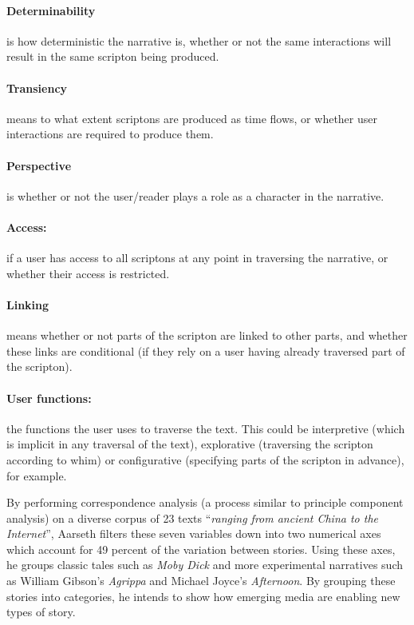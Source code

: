 \paragraph{Determinability} is how deterministic the narrative is, whether or not the same interactions will result in the same scripton being produced.
\paragraph{Transiency} means to what extent scriptons are produced as time flows, or whether user interactions are required to produce them.
\paragraph{Perspective} is whether or not the user/reader plays a role as a character in the narrative.
\paragraph{Access:} if a user has access to all scriptons at any point in traversing the narrative, or whether their access is restricted.
\paragraph{Linking} means whether or not parts of the scripton are linked to other parts, and whether these links are conditional (if they rely on a user having already traversed part of the scripton).
\paragraph{User functions:} the functions the user uses to traverse the text. This could be interpretive (which is implicit in any traversal of the text), explorative (traversing the scripton according to whim) or configurative (specifying parts of the scripton in advance), for example.


By performing correspondence analysis (a process similar to principle component analysis) on a diverse corpus of 23 texts ``\emph{ranging from ancient China to the Internet}'', Aarseth filters these seven variables down into two numerical axes which account for 49 percent of the variation between stories. Using these axes, he groups classic tales such as \emph{Moby Dick} and more experimental narratives such as William Gibson's \emph{Agrippa} and Michael Joyce's \emph{Afternoon}. By grouping these stories into categories, he intends to show how emerging media are enabling new types of story.

